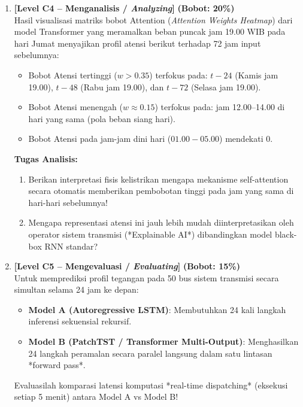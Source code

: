 \documentclass[11pt,a4paper]{article}
\begin{document}
\begin{enumerate}[leftmargin=1.5em, label=\textbf{Soal \arabic*.}]
    \newpage

    \item \textbf{[Level C4 -- Menganalisis / \textit{Analyzing}]} \hfill \textbf{(Bobot: 20\%)} \\
    Hasil visualisasi matriks bobot Attention (\textit{Attention Weights Heatmap}) dari model Transformer yang meramalkan beban puncak jam 19.00 WIB pada hari Jumat menyajikan profil atensi berikut terhadap 72 jam input sebelumnya:
    \begin{itemize}
        \item Bobot Atensi tertinggi ($w > 0.35$) terfokus pada: $t-24$ (Kamis jam 19.00), $t-48$ (Rabu jam 19.00), dan $t-72$ (Selasa jam 19.00).
        \item Bobot Atensi menengah ($w \approx 0.15$) terfokus pada: jam 12.00--14.00 di hari yang sama (pola beban siang hari).
        \item Bobot Atensi pada jam-jam dini hari ($01.00 - 05.00$) mendekati 0.
    \end{itemize}
    \textbf{Tugas Analisis:}
    \begin{enumerate}[label=\alph*.]
        \item Berikan interpretasi fisis kelistrikan mengapa mekanisme self-attention secara otomatis memberikan pembobotan tinggi pada jam yang sama di hari-hari sebelumnya!
        \item Mengapa representasi atensi ini jauh lebih mudah diinterpretasikan oleh operator sistem transmisi (*Explainable AI*) dibandingkan model black-box RNN standar?
    \end{enumerate}

    \vspace{0.4cm}

    \item \textbf{[Level C5 -- Mengevaluasi / \textit{Evaluating}]} \hfill \textbf{(Bobot: 15\%)} \\
    Untuk memprediksi profil tegangan pada 50 bus sistem transmisi secara simultan selama 24 jam ke depan:
    \begin{itemize}
        \item \textbf{Model A (Autoregressive LSTM)}: Membutuhkan 24 kali langkah inferensi sekuensial rekursif.
        \item \textbf{Model B (PatchTST / Transformer Multi-Output)}: Menghasilkan 24 langkah peramalan secara paralel langsung dalam satu lintasan *forward pass*.
    \end{itemize}
    Evaluasilah komparasi latensi komputasi *real-time dispatching* (eksekusi setiap 5 menit) antara Model A vs Model B!


\end{enumerate}
\end{document}
